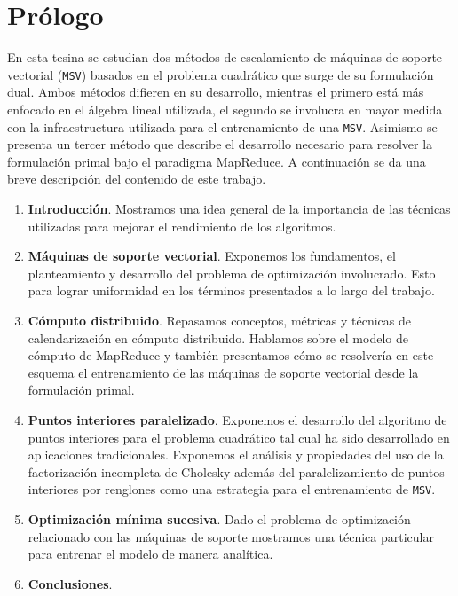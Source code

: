 \documentclass[10pt,oneside, chapterprefix]{scrbook} %
\begin{document}
\maketitle
\section*{Prólogo}
En esta tesina se estudian dos métodos de escalamiento de máquinas de soporte vectorial (\texttt{MSV}) basados en el problema cuadrático que surge de su formulación dual. Ambos métodos difieren en su desarrollo, mientras el primero está más enfocado en el álgebra lineal utilizada, el segundo se involucra en mayor medida con la infraestructura utilizada para el entrenamiento de una \texttt{MSV}. Asimismo se presenta un tercer método que describe el desarrollo necesario para resolver la formulación primal bajo el paradigma MapReduce. A continuación se da una breve descripción del contenido de este trabajo.
  
\begin{enumerate}
  \item {\bf Introducci\'on}. Mostramos una idea general de la importancia de las técnicas utilizadas para mejorar el rendimiento de los algoritmos.
  \item {\bf Máquinas de soporte vectorial}. Exponemos los fundamentos, el planteamiento y desarrollo del problema de optimización involucrado. Esto para lograr uniformidad en los términos presentados a lo largo del trabajo.
  \item {\bf Cómputo distribuido}. Repasamos conceptos, métricas y técnicas de calendarización en cómputo distribuido. Hablamos sobre el modelo de cómputo de MapReduce y también presentamos cómo se resolvería en este esquema el entrenamiento de las máquinas de soporte vectorial desde la formulación primal. 
  \item {\bf Puntos interiores paralelizado}. Exponemos el desarrollo del algoritmo de puntos interiores para el problema cuadrático tal cual ha sido desarrollado en aplicaciones tradicionales. Exponemos el análisis y propiedades del uso de la factorización incompleta de Cholesky además del paralelizamiento de puntos interiores por renglones como una estrategia para el entrenamiento de \texttt{MSV}. 
  \item {\bf Optimización mínima sucesiva}. Dado el problema de optimización relacionado con las máquinas de soporte mostramos una técnica particular para entrenar el modelo de manera analítica.
  \item {\bf Conclusiones}.
\end{enumerate}
\end{document}
